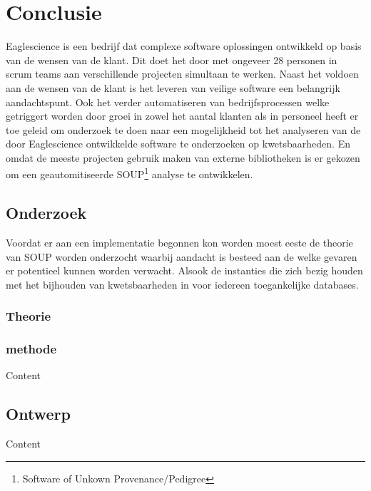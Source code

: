 
\chapter{Conclusie}\label{ch:conclusie} %
Eaglescience is een bedrijf dat complexe software oplossingen ontwikkeld op basis van de wensen van de klant. Dit doet het door met ongeveer 28 personen in scrum teams aan verschillende projecten simultaan te werken. Naast het voldoen aan de wensen van de klant is het leveren van veilige software een belangrijk aandachtspunt. Ook het verder automatiseren van bedrijfsprocessen welke getriggert worden door groei in zowel het aantal klanten als in personeel heeft er toe geleid om onderzoek te doen naar een mogelijkheid tot het analyseren van de door Eaglescience ontwikkelde software te onderzoeken op kwetsbaarheden. En omdat de meeste projecten gebruik maken van externe bibliotheken is er gekozen om een geautomitiseerde SOUP\footnote{Software of Unkown Provenance/Pedigree} analyse te ontwikkelen.




\section{Onderzoek}\label{sec:onderzoek}
Voordat er aan een implementatie begonnen kon worden moest eeste de theorie van SOUP worden onderzocht waarbij aandacht is besteed aan de welke gevaren er potentieel kunnen worden verwacht. Alsook de instanties die zich bezig houden met het bijhouden van kwetsbaarheden in voor iedereen toegankelijke databases.
\subsection{Theorie}\label{subsec:theorie}


\subsection{methode}\label{subsec:methode}

Content


\section{Ontwerp}\label{sec:implementatie}

Content
